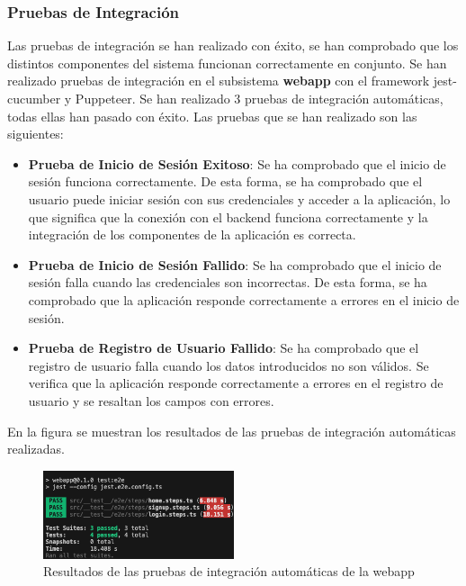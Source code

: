 \subsubsection{Pruebas de Integración}
Las pruebas de integración se han realizado con éxito, se han comprobado que los distintos componentes del sistema funcionan correctamente en conjunto.
Se han realizado pruebas de integración en el subsistema \textbf{webapp} con el framework jest-cucumber y Puppeteer.
Se han realizado 3 pruebas de integración automáticas, todas ellas han pasado con éxito.
Las pruebas que se han realizado son las siguientes:
\begin{itemize}
    \item \textbf{Prueba de Inicio de Sesión Exitoso}: Se ha comprobado que el inicio de sesión funciona correctamente. De esta forma, se ha comprobado que el usuario puede iniciar sesión con sus credenciales y acceder a la aplicación, 
    lo que significa que la conexión con el backend funciona correctamente y la integración de los componentes de la aplicación es correcta.
    \item \textbf{Prueba de Inicio de Sesión Fallido}: Se ha comprobado que el inicio de sesión falla cuando las credenciales son incorrectas. De esta forma, se ha comprobado que la aplicación responde correctamente a errores en el inicio de sesión.
     \item \textbf{Prueba de Registro de Usuario Fallido}: Se ha comprobado que el registro de usuario falla cuando los datos introducidos no son válidos. 
     Se verifica que la aplicación responde correctamente a errores en el registro de usuario y se resaltan los campos con errores.
\end{itemize}

En la figura  se muestran los resultados de las pruebas de integración automáticas realizadas.
\begin{figure}[H]
    \centering
    \includegraphics[width=0.5\textwidth]{figures/6-Analisis/6-Pruebas/6_8_webapp-e2e.png}
    \caption{Resultados de las pruebas de integración automáticas de la webapp}
    \hypertarget{fig:coverage_webapp2}{}
    \label{fig:coverage_webapp2}
\end{figure}

